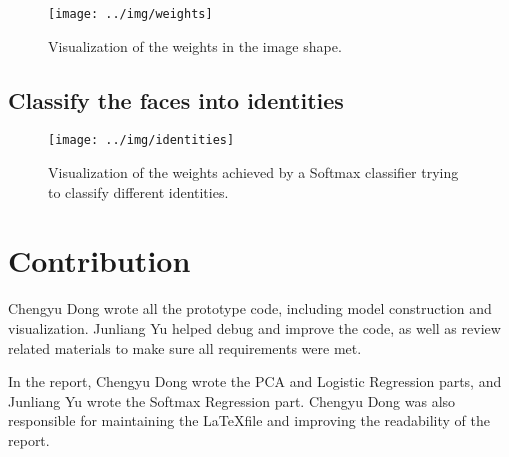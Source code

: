 \documentclass{article} %
\begin{document}
\begin{figure}[h]
\centering
\texttt{[image: ../img/weights]}
\caption{Visualization of the weights in the image shape.}
\label{fig:weight}
\end{figure}

\subsection{Classify the faces into identities}
\begin{figure}[h]
\centering
\texttt{[image: ../img/identities]}
\caption{Visualization of the weights achieved by a Softmax classifier trying to classify different identities.}
\label{fig:soft_error_mode}
\end{figure}


\section{Contribution}
Chengyu Dong wrote all the prototype code, including model construction and visualization. Junliang Yu helped debug and improve the code, as well as review related materials to make sure all requirements were met. 

In the report, Chengyu Dong wrote the PCA and Logistic Regression parts, and Junliang Yu wrote the Softmax Regression part. Chengyu Dong was also responsible for maintaining the \LaTeX file and improving the readability of the report.

%

%
%
%
%
\end{document}
